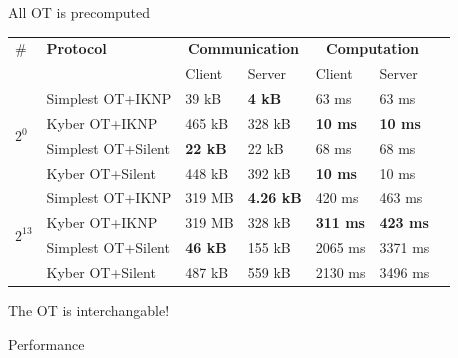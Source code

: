 \documentclass[10pt]{beamer}
\begin{document}
\begin{frame}{All OT is precomputed}
  \begin{tabularx}{\textwidth}{lllllll}
    \toprule
    \#&\textbf{Protocol} & \multicolumn{2}{c}{\textbf{Communication}} &  \multicolumn{2}{c}{\textbf{Computation}} \\
      & & Client & Server & Client & Server \\
      \midrule
    \multirow{4}{*}{$2^0$}   & Simplest OT+IKNP &39 kB & \textbf{4 kB} & 63 ms &
    63 ms \\
                             & Kyber OT+IKNP & 465 kB & 328 kB &
    \textbf{10 ms} & \textbf{10 ms} \\
                   & Simplest OT+Silent & \textbf{22 kB} & 22 kB &68 ms & 68 ms \\
                   & Kyber OT+Silent & 448 kB& 392 kB& \textbf{10 ms}& 10 ms\\
                   \midrule
                   \multirow{4}{*}{$2^{13}$}
                   & Simplest OT+IKNP & 319 MB & \textbf{4.26 kB} & 420 ms& 463 ms\\
                   & Kyber OT+IKNP & 319 MB& 328 kB&  \textbf{311 ms}&
                   \textbf{423 ms}\\
                   & Simplest OT+Silent & \textbf{46 kB} & 155 kB& 2065 ms& 3371 ms\\
                   & Kyber OT+Silent & 487 kB & 559 kB &2130 ms &3496 ms \\
                   \bottomrule
  \end{tabularx}
  \pause
  \alert{ The OT is interchangable!}
\end{frame}



\begin{frame}{Performance }
\end{frame}
\end{document}
